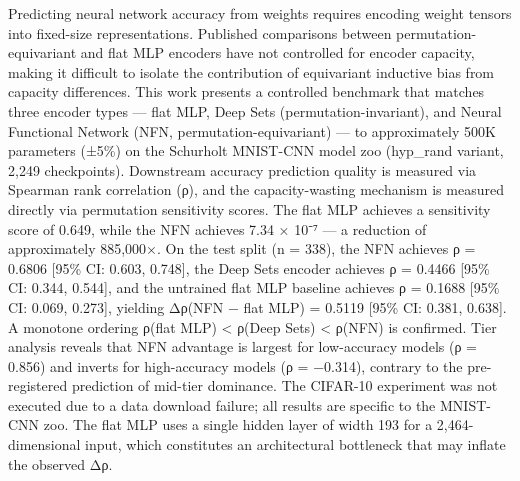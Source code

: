
Predicting neural network accuracy from weights requires encoding weight tensors into fixed-size representations. Published comparisons between permutation-equivariant and flat MLP encoders have not controlled for encoder capacity, making it difficult to isolate the contribution of equivariant inductive bias from capacity differences. This work presents a controlled benchmark that matches three encoder types — flat MLP, Deep Sets (permutation-invariant), and Neural Functional Network (NFN, permutation-equivariant) — to approximately 500K parameters (±5\%) on the Schurholt MNIST-CNN model zoo (hyp_rand variant, 2,249 checkpoints). Downstream accuracy prediction quality is measured via Spearman rank correlation (ρ), and the capacity-wasting mechanism is measured directly via permutation sensitivity scores. The flat MLP achieves a sensitivity score of 0.649, while the NFN achieves 7.34 × 10⁻⁷ — a reduction of approximately 885,000×. On the test split (n = 338), the NFN achieves ρ = 0.6806 [95\% CI: 0.603, 0.748], the Deep Sets encoder achieves ρ = 0.4466 [95\% CI: 0.344, 0.544], and the untrained flat MLP baseline achieves ρ = 0.1688 [95\% CI: 0.069, 0.273], yielding Δρ(NFN − flat MLP) = 0.5119 [95\% CI: 0.381, 0.638]. A monotone ordering ρ(flat MLP) < ρ(Deep Sets) < ρ(NFN) is confirmed. Tier analysis reveals that NFN advantage is largest for low-accuracy models (ρ = 0.856) and inverts for high-accuracy models (ρ = −0.314), contrary to the pre-registered prediction of mid-tier dominance. The CIFAR-10 experiment was not executed due to a data download failure; all results are specific to the MNIST-CNN zoo. The flat MLP uses a single hidden layer of width 193 for a 2,464-dimensional input, which constitutes an architectural bottleneck that may inflate the observed Δρ.

